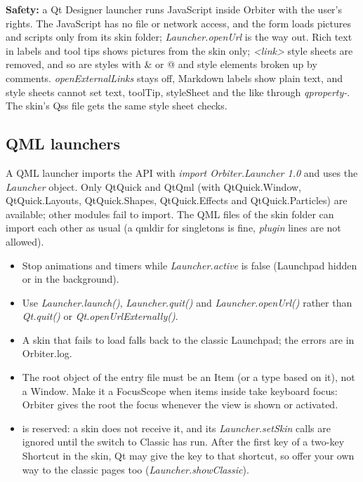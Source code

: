 \documentclass[Orbiter Developer Manual.tex]{subfiles}
\begin{document}
\begin{sloppypar}
\noindent
\textbf{Safety:} a Qt Designer launcher runs JavaScript inside Orbiter with the user's rights. The JavaScript has no file or network access, and the form loads pictures and scripts only from its skin folder; \textit{Launcher.openUrl} is the way out. Rich text in labels and tool tips shows pictures from the skin only; \textit{<link>} style sheets are removed, and so are styles with \& or @ and style elements broken up by comments. \textit{openExternalLinks} stays off, Markdown labels show plain text, and style sheets cannot set text, toolTip, styleSheet and the like through \textit{qproperty-}. The skin's Qss file gets the same style sheet checks.


\subsection{QML launchers}
A QML launcher imports the API with \textit{import Orbiter.Launcher 1.0} and uses the \textit{Launcher} object. Only QtQuick and QtQml (with QtQuick.Window, QtQuick.Layouts, QtQuick.Shapes, QtQuick.Effects and QtQuick.Particles) are available; other modules fail to import. The QML files of the skin folder can import each other as usual (a qmldir for singletons is fine, \textit{plugin} lines are not allowed).

\begin{itemize}
\item Stop animations and timers while \textit{Launcher.active} is false (Launchpad hidden or in the background).
\item Use \textit{Launcher.launch()}, \textit{Launcher.quit()} and \textit{Launcher.openUrl()} rather than \textit{Qt.quit()} or \textit{Qt.openUrlExternally()}.
\item A skin that fails to load falls back to the classic Launchpad; the errors are in Orbiter.log.
\item The root object of the entry file must be an Item (or a type based on it), not a Window. Make it a FocusScope when items inside take keyboard focus: Orbiter gives the root the focus whenever the view is shown or activated.
\item \Ctrl\Shift{} is reserved: a skin does not receive it, and its \textit{Launcher.setSkin} calls are ignored until the switch to Classic has run. After the first key of a two-key Shortcut in the skin, Qt may give the key to that shortcut, so offer your own way to the classic pages too (\textit{Launcher.showClassic}).
\end{itemize}


\end{sloppypar}
\end{document}
